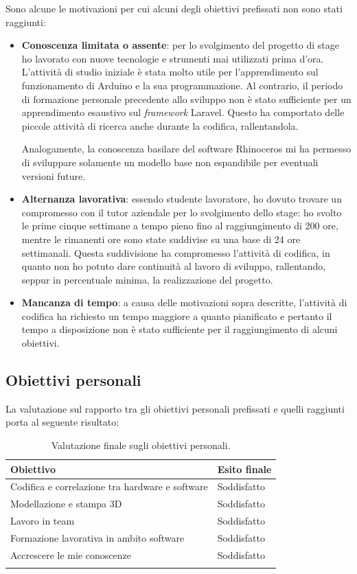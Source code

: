 Sono alcune le motivazioni per cui alcuni degli obiettivi prefissati non sono stati raggiunti:

\begin{itemize}
\item \textbf{Conoscenza limitata o assente}: per lo svolgimento del progetto di stage ho lavorato con nuove tecnologie e strumenti mai utilizzati prima d'ora. L'attività di studio iniziale è stata molto utile per l'apprendimento sul funzionamento di Arduino e la sua programmazione. Al contrario, il periodo di formazione personale precedente allo sviluppo non è stato sufficiente per un apprendimento esaustivo sul \textit{framework} Laravel. Questo ha comportato delle piccole attività di ricerca anche durante la codifica, rallentandola.

Analogamente, la conoscenza basilare del software Rhinoceros mi ha permesso di sviluppare solamente un modello base non espandibile per eventuali versioni future.
\item \textbf{Alternanza lavorativa}: essendo studente lavoratore, ho dovuto trovare un compromesso con il tutor aziendale per lo svolgimento dello stage: ho svolto le prime cinque settimane a tempo pieno fino al raggiungimento di 200 ore, mentre le rimanenti ore sono state suddivise su una base di 24 ore settimanali. Questa suddivisione ha compromesso l'attività di codifica, in quanto non ho potuto dare continuità al lavoro di sviluppo, rallentando, seppur in percentuale minima, la realizzazione del progetto.
\item \textbf{Mancanza di tempo}: a causa delle motivazioni sopra descritte, l'attività di codifica ha richiesto un tempo maggiore a quanto pianificato e pertanto il tempo a disposizione non è stato sufficiente per il raggiungimento di alcuni obiettivi.
\end{itemize}

\subsection{Obiettivi personali}
La valutazione sul rapporto tra gli obiettivi personali prefissati e quelli raggiunti porta al seguente risultato:

\begin{longtable}{|p{10.5cm}|p{3cm}|}
\hline
\textbf{Obiettivo} & \textbf{Esito finale} \\ 
\hline
Codifica e correlazione tra hardware e software & Soddisfatto \\ 
\hline
Modellazione e stampa 3D & Soddisfatto \\ 
\hline
Lavoro in team & Soddisfatto \\ 
\hline
Formazione lavorativa in ambito software & Soddisfatto \\ 
\hline
Accrescere le mie conoscenze & Soddisfatto \\ 
\hline
\caption{Valutazione finale sugli obiettivi personali.}
\end{longtable}

